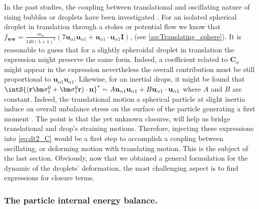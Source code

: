 In the past studies, the coupling between translational and oscillating nature of rising bubbles or droplets have been investigated \citet{lalanne2013effect}. 
For an isolated spherical droplet in translation through a stokes or potential flow we know that $
    f_\textbf{ww}
    = \frac{m_\alpha}{140 (\lambda +1)^2}
    (7 \textbf{u}_{\alpha 1} \textbf{u}_{\alpha 1} + \textbf{u}_{\alpha 1}\cdot \textbf{u}_{\alpha 1}\textbf{I})$, 
(see \ref{ap:Translating_sphere}). 
It is reasonable to guess that for a slightly spheroidal droplet in translation the expression might preserve the same form. 
Indeed, a coefficient related to $\textbf{C}_\alpha$ might appear in the expression nevertheless the overall contribution must be still proportional to $\textbf{u}_{\alpha 1} \textbf{u}_{\alpha 1}$. 
Likewise, for an inertial drops, it might be found that 
$\intS{(\textbf{r}\bm\sigma_1^0+ \bm\sigma_1^0\textbf{r})\cdot \textbf{n}}^* \sim A \textbf{u}_{\alpha 1} \textbf{u}_{\alpha 1} + B \textbf{u}_{\alpha 1} \cdot \textbf{u}_{\alpha 1}$ where $A$ and $B$ are constant. 
Indeed, the translational motion a spherical particle at slight inertia induce an overall unbalance stress on the surface of the particle generating a first moment \citet{taylor1964deformation}. 
The point is that the yet unknown closures, will help us bridge translational and drop's straining motions. 
Therefore, injecting these expressions into \ref{eq:dt2_C} would be a first step to accomplish a coupling between oscillating, or deforming motion with translating motion.
This is the subject of the last section. 
Obviously, now that we obtained a general formulation for the dynamic of the droplets' deformation, the most challenging aspect is to find expressions for closure terms. 


\subsubsection*{The particle internal energy balance.}

